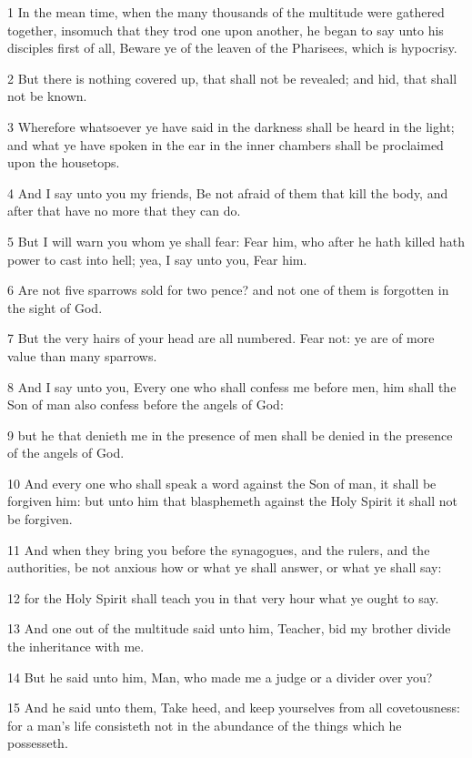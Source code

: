 \par 1 In the mean time, when the many thousands of the multitude were gathered together, insomuch that they trod one upon another, he began to say unto his disciples first of all, Beware ye of the leaven of the Pharisees, which is hypocrisy.
\par 2 But there is nothing covered up, that shall not be revealed; and hid, that shall not be known.
\par 3 Wherefore whatsoever ye have said in the darkness shall be heard in the light; and what ye have spoken in the ear in the inner chambers shall be proclaimed upon the housetops.
\par 4 And I say unto you my friends, Be not afraid of them that kill the body, and after that have no more that they can do.
\par 5 But I will warn you whom ye shall fear: Fear him, who after he hath killed hath power to cast into hell; yea, I say unto you, Fear him.
\par 6 Are not five sparrows sold for two pence? and not one of them is forgotten in the sight of God.
\par 7 But the very hairs of your head are all numbered. Fear not: ye are of more value than many sparrows.
\par 8 And I say unto you, Every one who shall confess me before men, him shall the Son of man also confess before the angels of God:
\par 9 but he that denieth me in the presence of men shall be denied in the presence of the angels of God.
\par 10 And every one who shall speak a word against the Son of man, it shall be forgiven him: but unto him that blasphemeth against the Holy Spirit it shall not be forgiven.
\par 11 And when they bring you before the synagogues, and the rulers, and the authorities, be not anxious how or what ye shall answer, or what ye shall say:
\par 12 for the Holy Spirit shall teach you in that very hour what ye ought to say.
\par 13 And one out of the multitude said unto him, Teacher, bid my brother divide the inheritance with me.
\par 14 But he said unto him, Man, who made me a judge or a divider over you?
\par 15 And he said unto them, Take heed, and keep yourselves from all covetousness: for a man's life consisteth not in the abundance of the things which he possesseth.
